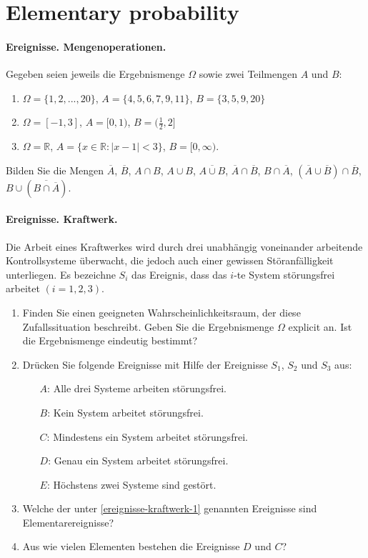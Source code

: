

\section{Elementary probability}



\paragraph{Ereignisse. Mengenoperationen.}
Gegeben seien jeweils die Ergebnismenge $\Omega$ sowie zwei Teilmengen
$A$ und $B$:
\begin{enumerate}
\item $\Omega=\{1,2,...,20\}$, $A=\{4,5,6,7,9,11\}$, $B=\{3,5,9,20\}$
\item $\Omega=[-1,3]$, $A=[0,1)$, $B=(\frac{1}{2},2]$
\item $\Omega=\mathbb R$, $A=\{x\in \mathbb R: |x-1|<3\}$, $B=[0,\infty)$.
\end{enumerate}
Bilden Sie die Mengen $\overline{A}$, $\overline{B}$, $A\cap B$, $A\cup B$,
$\overline{ A\cup B}$, $\overline{A}\cap\overline{B}$, $B\cap\overline{A}$,
$(\overline{A}\cup\overline{B})\cap\overline{B}$,
$B\cup(\overline{B\cap\overline{A}})$.


\paragraph{Ereignisse. Kraftwerk.}
Die Arbeit eines Kraftwerkes wird durch drei unabhängig voneinander arbeitende
Kontrollsysteme überwacht, die jedoch auch einer gewissen Störanfälligkeit
unterliegen. Es bezeichne $S_i$ das Ereignis, dass das $i$-te System
störungsfrei arbeitet $(i=1,2,3)$.
\begin{enumerate}
    \item Finden Sie einen geeigneten Wahrscheinlichkeitsraum, der diese
        Zufallssituation beschreibt. Geben Sie die Ergebnismenge $\Omega$
        explicit an. Ist die Ergebnismenge eindeutig bestimmt?
    \item Drücken Sie folgende Ereignisse mit Hilfe der Ereignisse $S_1$, $S_2$
        und $S_3$ aus:
        \begin{itemize}
            \item[$A$:] Alle drei Systeme arbeiten störungsfrei.
            \item[$B$:] Kein System arbeitet störungsfrei.
            \item[$C$:] Mindestens ein System arbeitet störungsfrei.
            \item[$D$:] Genau ein System arbeitet störungsfrei.
            \item[$E$:] Höchstens zwei Systeme sind gestört.
        \end{itemize}\label{ereignisse-kraftwerk-1}
    \item Welche der unter \ref{ereignisse-kraftwerk-1} genannten Ereignisse
        sind Elementarereignisse?
    \item Aus wie vielen Elementen bestehen die Ereignisse $D$ und $C$?
\end{enumerate}

